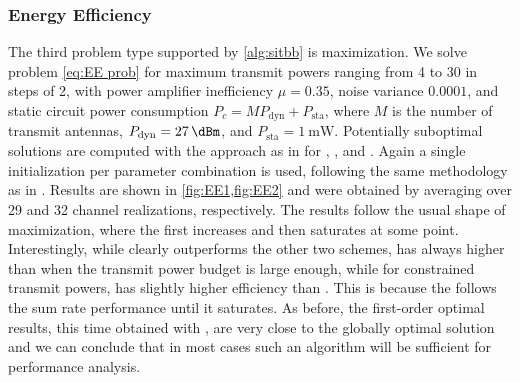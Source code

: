 \documentclass[a4paper,10pt,journal]{IEEEtran}
\begin{document}
\subsubsection{Energy Efficiency}
The third problem type supported by \cref{alg:sitbb} is  maximization. We solve problem \cref{eq:EE prob} for maximum transmit powers ranging from \SI{4}{\dBm} to \SI{30}{\dBm} in steps of \SI{2}{\dBm}, with power amplifier inefficiency $\mu = 0.35$, noise variance $0.0001$, and static circuit power consumption $P_c = M P_\mathrm{dyn} + P_\mathrm{sta}$, where $M$ is the number of transmit antennas,  $P_\mathrm{dyn} = \SI{27}{\dBm}$, and $P_\mathrm{sta} = \SI{1}{\milli\W}$.
Potentially suboptimal solutions are computed with the  approach \cite{IETBook} as in \cite{mao2018EE} for  , , and . Again a single initialization per parameter combination is used, following the same methodology as in \cite{mao2018EE}.
Results are shown in \cref{fig:EE1,fig:EE2} and were obtained by averaging over 29 and 32  channel realizations, respectively. The results follow the usual shape of  maximization, where the  first increases and then saturates at some point. Interestingly, while  clearly outperforms the other two schemes,  has always higher  than  when the transmit power budget is large enough, while for constrained transmit powers,  has slightly higher efficiency than .
This is because the  follows the sum rate performance until it saturates.
As before, the first-order optimal results, this time obtained with , are very close to the globally optimal solution and we can conclude that in most cases such an algorithm will be sufficient for performance analysis.
\end{document}
